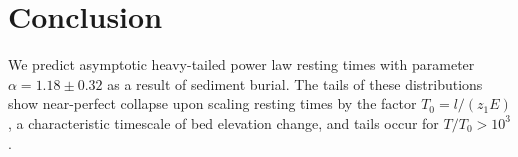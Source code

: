 \documentclass[draft]{agujournal2018}
\begin{document}

\section{Conclusion}


We predict asymptotic heavy-tailed power law resting times with parameter $\alpha = 1.18 \pm 0.32$ as a result of sediment burial.
The tails of these distributions show near-perfect collapse upon scaling resting times by the factor $T_0 = l/(z_1 E)$, a characteristic timescale of bed elevation change, and tails occur for $T/T_0>10^3$.
\end{document}

